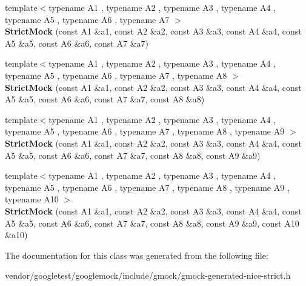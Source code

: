 \begin{DoxyCompactItemize}
\item 
\mbox{\label{classtesting_1_1_strict_mock_a4af48752fc22815250369292b9c064bc}} 
{\footnotesize template$<$typename A1 , typename A2 , typename A3 , typename A4 , typename A5 , typename A6 , typename A7 $>$ }\\{\bfseries Strict\+Mock} (const A1 \&a1, const A2 \&a2, const A3 \&a3, const A4 \&a4, const A5 \&a5, const A6 \&a6, const A7 \&a7)
\item 
\mbox{\label{classtesting_1_1_strict_mock_aac6eaaad3e94491ada7bb43ee6149775}} 
{\footnotesize template$<$typename A1 , typename A2 , typename A3 , typename A4 , typename A5 , typename A6 , typename A7 , typename A8 $>$ }\\{\bfseries Strict\+Mock} (const A1 \&a1, const A2 \&a2, const A3 \&a3, const A4 \&a4, const A5 \&a5, const A6 \&a6, const A7 \&a7, const A8 \&a8)
\item 
\mbox{\label{classtesting_1_1_strict_mock_a4129f247ae087d586fdb04f450422d3e}} 
{\footnotesize template$<$typename A1 , typename A2 , typename A3 , typename A4 , typename A5 , typename A6 , typename A7 , typename A8 , typename A9 $>$ }\\{\bfseries Strict\+Mock} (const A1 \&a1, const A2 \&a2, const A3 \&a3, const A4 \&a4, const A5 \&a5, const A6 \&a6, const A7 \&a7, const A8 \&a8, const A9 \&a9)
\item 
\mbox{\label{classtesting_1_1_strict_mock_a4936b0a5622b39e974deae12ecb1430b}} 
{\footnotesize template$<$typename A1 , typename A2 , typename A3 , typename A4 , typename A5 , typename A6 , typename A7 , typename A8 , typename A9 , typename A10 $>$ }\\{\bfseries Strict\+Mock} (const A1 \&a1, const A2 \&a2, const A3 \&a3, const A4 \&a4, const A5 \&a5, const A6 \&a6, const A7 \&a7, const A8 \&a8, const A9 \&a9, const A10 \&a10)
\end{DoxyCompactItemize}


The documentation for this class was generated from the following file\+:\begin{DoxyCompactItemize}
\item 
vendor/googletest/googlemock/include/gmock/gmock-\/generated-\/nice-\/strict.\+h\end{DoxyCompactItemize}
